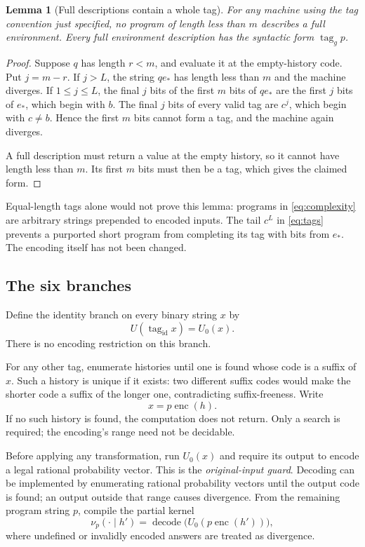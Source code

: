 \documentclass[11pt]{article}
\newtheorem{lemma}[theorem]{Lemma}
\theoremstyle{definition}
\theoremstyle{remark}
\newcommand{\enc}{\operatorname{enc}}
\newcommand{\id}{\mathrm{id}}
\newcommand{\tagword}{\operatorname{tag}}
\begin{document}
\begin{lemma}[Full descriptions contain a whole tag]
\label{lem:framing}
For any machine using the tag convention just specified, no program
of length less than $m$ describes a full environment.  Every full
environment description has the syntactic form $\tagword_g p$.
\end{lemma}

\begin{proof}
Suppose $q$ has length $r<m$, and evaluate it at the empty-history
code.  Put $j=m-r$.  If $j>L$, the string $qe_*$ has length less
than $m$ and the machine diverges.  If $1\le j\le L$, the final
$j$ bits of the first $m$ bits of $qe_*$ are the first $j$ bits of
$e_*$, which begin with $b$.  The final $j$ bits of every valid
tag are $c^j$, which begin with $c\ne b$.  Hence the first $m$
bits cannot form a tag, and the machine again diverges.

A full description must return a value at the empty history, so it
cannot have length less than $m$.  Its first $m$ bits must then be
a tag, which gives the claimed form.
\end{proof}

Equal-length tags alone would not prove this lemma: programs in
\eqref{eq:complexity} are arbitrary strings prepended to encoded
inputs.  The tail $c^L$ in \eqref{eq:tags} prevents a purported short
program from completing its tag with bits from $e_*$.  The encoding
itself has not been changed.

\subsection{The six branches}

Define the identity branch on every binary string $x$ by
\begin{equation}
  U(\tagword_{\id}x)=U_0(x).
  \label{eq:identity-port}
\end{equation}
There is no encoding restriction on this branch.

For any other tag, enumerate histories until one is found whose code
is a suffix of $x$.  Such a history is unique if it exists: two
different suffix codes would make the shorter code a suffix of the
longer one, contradicting suffix-freeness.  Write
\[
  x=p\enc(h).
\]
If no such history is found, the computation does not return.
Only a search is required; the encoding's range need not be decidable.

Before applying any transformation, run $U_0(x)$ and require its
output to encode a legal rational probability vector.  This is the
\emph{original-input guard}.  Decoding can be implemented by
enumerating rational probability vectors until the output code is
found; an output outside that range causes divergence.  From the
remaining program string $p$, compile the partial kernel
\begin{equation}
  \nu_p(\cdot\mid h')=
      \operatorname{decode}\bigl(U_0(p\enc(h'))\bigr),
  \label{eq:base-kernel}
\end{equation}
where undefined or invalidly encoded answers are treated as
divergence.
\end{document}
